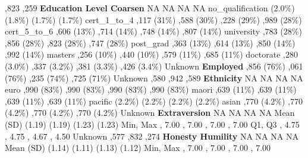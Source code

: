 \documentclass[
  single column]{article}
\begin{document}
\begin{table}
{,823 ,259 \textbar{} \textbar{}\textbf{Education
Level Coarsen} \textbar NA \textbar NA \textbar NA \textbar NA
\textbar{} \textbar no\_qualification  (2.0\%) 
(1.8\%)  (1.7\%)  (1.7\%) \textbar{}
\textbar cert\_1\_to\_4 ,117 (31\%) ,588 (30\%)
,228 (29\%) ,989 (28\%) \textbar{}
\textbar cert\_5\_to\_6 ,606 (13\%) ,714 (14\%)
,748 (14\%) ,807 (14\%) \textbar{} \textbar university
,783 (28\%) ,856 (28\%) ,823 (28\%)
,747 (28\%) \textbar{} \textbar post\_grad ,363
(13\%) ,614 (13\%) ,850 (14\%) ,992 (14\%)
\textbar{} \textbar masters ,256 (10\%) ,440 (10\%)
,579 (11\%) ,685 (11\%) \textbar{} \textbar doctorate
,280 (3.0\%) ,337 (3.2\%) ,381 (3.3\%)
,426 (3.4\%) \textbar{} \textbar Unknown 
   \textbar{}
\textbar{}\textbf{Employed} ,856 (76\%) ,061 (76\%)
,235 (74\%) ,725 (71\%) \textbar{} \textbar Unknown
 ,580 ,942 ,589 \textbar{}
\textbar{}\textbf{Ethnicity} \textbar NA \textbar NA \textbar NA
\textbar NA \textbar{} \textbar euro ,990 (83\%)
,990 (83\%) ,990 (83\%) ,990 (83\%)
\textbar{} \textbar maori ,639 (11\%) ,639 (11\%)
,639 (11\%) ,639 (11\%) \textbar{} \textbar pacific
 (2.2\%)  (2.2\%)  (2.2\%) 
(2.2\%) \textbar{} \textbar asian ,770 (4.2\%) ,770
(4.2\%) ,770 (4.2\%) ,770 (4.2\%) \textbar{}
\textbar Unknown    
\textbar{} \textbar{}\textbf{Extraversion} \textbar NA \textbar NA
\textbar NA \textbar NA \textbar{} \textbar Mean (SD) 
(1.19)  (1.19)  (1.23)  (1.23)
\textbar{} \textbar Min, Max , 7.00 , 7.00
, 7.00 , 7.00 \textbar{} \textbar Q1, Q3
, 4.75 , 4.75 , 4.67 ,
4.50 \textbar{} \textbar Unknown  ,577
,832 ,274 \textbar{} \textbar{}\textbf{Honesty
Humility} \textbar NA \textbar NA \textbar NA \textbar NA \textbar{}
\textbar Mean (SD)  (1.14)  (1.11) 
(1.13)  (1.12) \textbar{} \textbar Min, Max ,
7.00 , 7.00 , 7.00 , 7.00 \textbar{}
}
\end{table}
\end{document}
